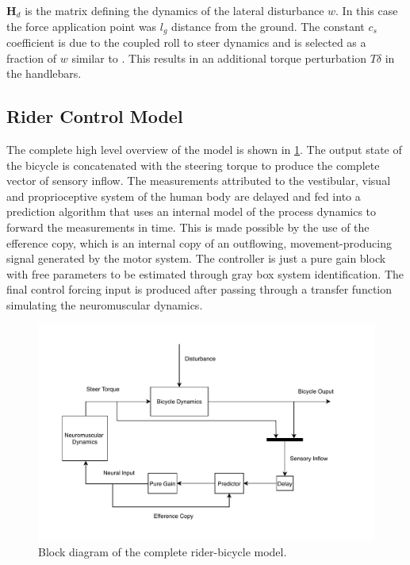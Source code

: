 \ensuremath{\mathbf{H}_d} is the matrix defining the dynamics of the lateral disturbance \ensuremath{w}. In this case the force application point was \ensuremath{l_g} distance from the ground. The constant \ensuremath{c_s} coefficient is due to the coupled roll to steer dynamics and is selected as a fraction of \ensuremath{w} similar to \citet{schwab2013}. This results in an additional  torque perturbation \ensuremath{T\delta } in the handlebars.

\subsection{Rider Control Model}\label{subsec:rider_model}

 The complete high level overview of the model is shown in \cref{fig:paper3}. The output state of the bicycle is concatenated with the steering torque to produce the complete vector of sensory inflow. The measurements attributed to the vestibular, visual and proprioceptive system of the human body are delayed and fed into a prediction algorithm that uses an internal model of the process dynamics to forward the measurements in time. This is made possible by the use of the efference copy, which is an internal copy of an outflowing, movement-producing signal generated by the motor system. The controller  is just a pure gain block with free parameters to be estimated through gray box system identification. The final control forcing input is produced after passing through a transfer function simulating the neuromuscular dynamics.
\begin{figure}[ht]
    \centering
    \captionsetup{justification=centering,margin=2cm}

    \includegraphics[scale=0.8]{images/high_level_block.pdf}
    \caption{Block diagram of the complete rider-bicycle model.} 
    \label{fig:paper3}
\end{figure}

